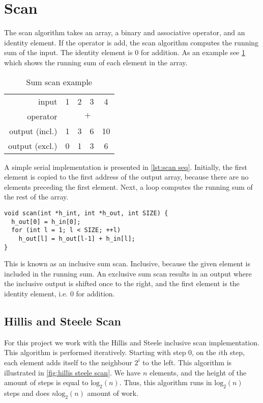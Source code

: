 \section{Scan}
\label{sec:scan}

The scan algorithm takes an array, a binary and associative operator, and an identity element.
If the operator is add, the scan algorithm computes the running sum of the input.
The identity element is 0 for addition.
As an example see \cref{tab:scan example} which shows the running sum of each element in the array.

\begin{table}[htb]
  \centering
  \begin{tabular}{r | c c c c}
    \toprule
    input & 1 & 2 & 3 & 4 \\
    operator & \multicolumn{4}{c}{$\mathtt{+}$} \\
    output (incl.) & 1 & 3 & 6 & 10 \\
    output (excl.) & 0 & 1 & 3 & 6 \\
    \bottomrule
  \end{tabular}
  \caption{Sum scan example}
  \label{tab:scan example}
\end{table}
    
A simple serial implementation is presented in \cref{lst:scan seq}.
Initially, the first element is copied to the first address of the output array, because there are no elements preceding the first element.
Next, a loop computes the running sum of the rest of the array.

\begin{lstlisting}[caption={Serial scan}, label={lst:scan seq}]
void scan(int *h_int, int *h_out, int SIZE) {
  h_out[0] = h_in[0];
  for (int l = 1; l < SIZE; ++l)
    h_out[l] = h_out[l-1] + h_in[l];
}
\end{lstlisting}

This is known as an inclusive sum scan.
Inclusive, because the given element is included in the running sum.
An exclusive sum scan results in an output where the inclusive output is shifted once to the right, and the first element is the identity element, i.e. 0 for addition.

\subsection{Hillis and Steele Scan}
\label{sec:hillis and steele scan}

For this project we work with the Hillis and Steele inclusive scan implementation.
This algorithm is performed iteratively.
Starting with step 0, on the $i$th step, each element adds itself to the neighbour $2^i$ to the left.
This algorithm is illustrated in \cref{fig:hillis steele scan}.
We have $n$ elements, and the height of the amount of steps is equal to $\mathrm{log}_2(n)$.
Thus, this algorithm runs in $\mathrm{log}_2(n)$ steps and does $n \mathrm{log}_2(n)$ amount of work.

